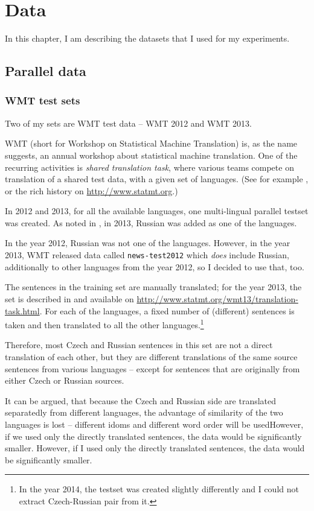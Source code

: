 \chapter{Data}
In this chapter, I am describing the datasets that I used for my experiments.

\section{Parallel data}

\subsection{WMT test sets}
Two of my sets are WMT test data -- WMT 2012 and WMT 2013.

WMT (short for Workshop on Statistical Machine Translation) is, as the name suggests, an annual workshop about statistical machine translation. One of the recurring activities is \emph{shared translation task}, where various teams compete on translation of a shared test data, with a given set of languages. (See for example \cite{wmt_findings_2013}, or the rich history on \url{http://www.statmt.org}.) 


In 2012 and 2013, for all the available languages, one multi-lingual parallel testset was created.
As noted in \cite{wmt_findings_2013}, in 2013, Russian was added as one of the languages. 

In the year 2012, Russian was not one of the languages. However, in the year 2013, WMT released data called \texttt{news-test2012} which \emph{does} include Russian, additionally to other languages from the year 2012, so I decided to use that, too.

The sentences in the training set are manually translated; for the year 2013, the set is described in \cite{wmt_findings_2013} and available on \url{http://www.statmt.org/wmt13/translation-task.html}. For each of the languages, a fixed number of (different) sentences is taken and then translated to all the other languages.\footnote{In the year 2014, the testset was created slightly differently and I could not extract Czech-Russian pair from it.}


Therefore, most Czech and Russian sentences in this set are not a direct translation of each other, but they are different translations of the same source sentences from various languages -- except for sentences that are originally from either Czech or Russian sources. 

It can be argued, that because the Czech and Russian side are translated separatedly from different languages, the advantage of similarity of the two languages is lost -- different idoms and different word order will be usedHowever, if we used only the directly translated sentences, the data would be significantly smaller. 
However, if I used only the directly translated sentences, the data would be significantly smaller. 

